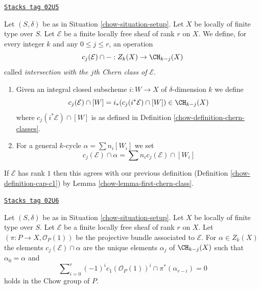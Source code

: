 \begin{definition}
\label{chow-definition-cap-chern-classes}
\href{https://stacks.math.columbia.edu/tag/02U5}{\texttt{Stacks tag 02U5}}

Let $(S, \delta)$ be as in Situation \ref{chow-situation-setup}.
Let $X$ be locally of finite type over $S$.
Let $\mathcal{E}$ be a finite locally free sheaf of rank $r$ on $X$.
We define, for every integer $k$ and any $0 \leq j \leq r$,
an operation
$$
c_j(\mathcal{E}) \cap - : Z_k(X) \to \CH_{k - j}(X)
$$
called {\it intersection with the $j$th Chern class of $\mathcal{E}$}.
\begin{enumerate}
\item Given an integral closed subscheme $i : W \to X$ of $\delta$-dimension
$k$ we define
$$
c_j(\mathcal{E}) \cap [W] = i_*(c_j({i^*\mathcal{E}}) \cap [W])
\in
\CH_{k - j}(X)
$$
where $c_j({i^*\mathcal{E}}) \cap [W]$ is as defined in
Definition \ref{chow-definition-chern-classes}.
\item For a general $k$-cycle $\alpha = \sum n_i [W_i]$ we set
$$
c_j(\mathcal{E}) \cap \alpha = \sum n_i c_j(\mathcal{E}) \cap [W_i]
$$
\end{enumerate}
\end{definition}

If $\mathcal{E}$ has rank $1$ then this agrees with our
previous definition (Definition \ref{chow-definition-cap-c1})
by Lemma \ref{chow-lemma-first-chern-class}.

\begin{lemma}
\label{chow-lemma-determine-intersections}
\href{https://stacks.math.columbia.edu/tag/02U6}{\texttt{Stacks tag 02U6}}

Let $(S, \delta)$ be as in Situation \ref{chow-situation-setup}.
Let $X$ be locally of finite type over $S$.
Let $\mathcal{E}$ be a finite locally free sheaf of rank $r$ on $X$.
Let $(\pi : P \to X, \mathcal{O}_P(1))$ be the projective bundle
associated to $\mathcal{E}$.
For $\alpha \in Z_k(X)$ the elements
$c_j(\mathcal{E}) \cap \alpha$ are the unique elements
$\alpha_j$ of $\CH_{k - j}(X)$
such that $\alpha_0 = \alpha$ and
$$
\sum\nolimits_{i = 0}^r
(-1)^i c_1(\mathcal{O}_P(1))^i \cap
\pi^*(\alpha_{r - i}) = 0
$$
holds in the Chow group of $P$.
\end{lemma}

